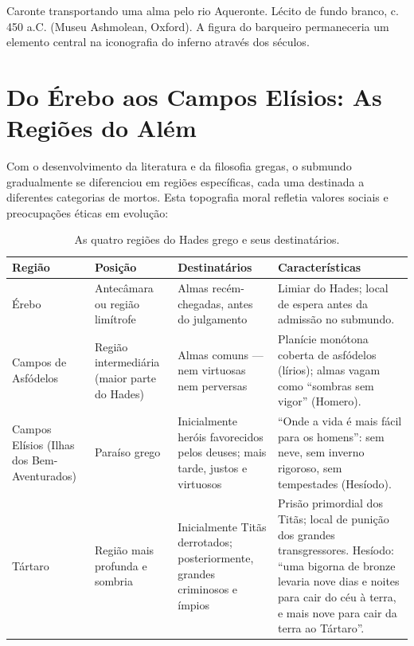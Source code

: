 Caronte transportando uma alma pelo rio Aqueronte. Lécito de fundo branco, c. 450 a.C. (Museu Ashmolean, Oxford). A figura do barqueiro permaneceria um elemento central na iconografia do inferno através dos séculos.

\section{Do Érebo aos Campos Elísios: As Regiões do Além}

Com o desenvolvimento da literatura e da filosofia gregas, o submundo gradualmente se diferenciou em regiões específicas, cada uma destinada a diferentes categorias de mortos. Esta topografia moral refletia valores sociais e preocupações éticas em evolução:

\begin{table}[ht]
  \centering
  \small
  \renewcommand{\arraystretch}{1.3}
  \caption{As quatro regiões do Hades grego e seus destinatários.}
  \label{tab:regioes-hades}
  \begin{tabularx}{\textwidth}{|>{\raggedright\arraybackslash}p{2.8cm}|>{\raggedright\arraybackslash}p{2.6cm}|>{\raggedright\arraybackslash}p{2.8cm}|X|}
    \hline
    \textbf{Região} & \textbf{Posição} & \textbf{Destinatários} & \textbf{Características} \\
    \hline
    Érebo & Antecâmara ou região limítrofe & Almas recém-chegadas, antes do julgamento & Limiar do Hades; local de espera antes da admissão no submundo. \\
    \hline
    Campos de Asfódelos & Região intermediária (maior parte do Hades) & Almas comuns --- nem virtuosas nem perversas & Planície monótona coberta de asfódelos (lírios); almas vagam como ``sombras sem vigor'' (Homero). \\
    \hline
    Campos Elísios (Ilhas dos Bem-Aventurados) & Paraíso grego & Inicialmente heróis favorecidos pelos deuses; mais tarde, justos e virtuosos & ``Onde a vida é mais fácil para os homens'': sem neve, sem inverno rigoroso, sem tempestades (Hesíodo). \\
    \hline
    Tártaro & Região mais profunda e sombria & Inicialmente Titãs derrotados; posteriormente, grandes criminosos e ímpios & Prisão primordial dos Titãs; local de punição dos grandes transgressores. Hesíodo: ``uma bigorna de bronze levaria nove dias e noites para cair do céu à terra, e mais nove para cair da terra ao Tártaro''. \\
    \hline
  \end{tabularx}
\end{table}


